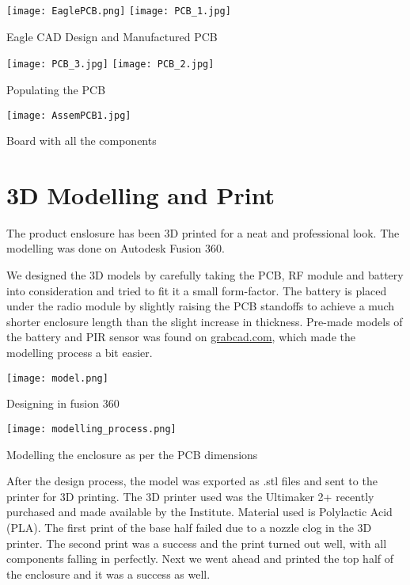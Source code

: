 \begin{center}
		\texttt{[image: EaglePCB.png]}		
		\hspace{10pt}
		\texttt{[image: PCB\_1.jpg]}
		
		Eagle CAD Design and Manufactured PCB
		
		\texttt{[image: PCB\_3.jpg]}		
		\texttt{[image: PCB\_2.jpg]}		
		
		Populating the PCB
		
		\vspace{20pt}
		\texttt{[image: AssemPCB1.jpg]}
		
		Board with all the components
		
		
\end{center}

\section{3D Modelling and Print}
The product enslosure has been 3D printed for a neat and professional look. The modelling was done on Autodesk Fusion 360.

We designed the 3D models by carefully taking the PCB, RF module and battery into consideration and tried to fit it a small form-factor. The battery is placed under the radio module by slightly raising the PCB standoffs to achieve a much shorter enclosure length than the slight increase in thickness. Pre-made models of the battery and PIR sensor was found on \url{grabcad.com}\cite{grabcad}, which made the modelling process a bit easier.

\begin{center}
	\texttt{[image: model.png]}
	
	Designing in fusion 360	
	\vspace{15pt}
	
	\texttt{[image: modelling\_process.png]}
	
	Modelling the enclosure as per the PCB dimensions
	\vspace{15pt}

\end{center}

After the design process, the model was exported as .stl files and sent to the printer for 3D printing. The 3D printer used was the Ultimaker 2+ recently purchased and made available by the Institute. Material used is Polylactic Acid (PLA). The first print of the base half failed due to a nozzle clog in the 3D printer. The second print was a success and the print turned out well, with all components falling in perfectly. Next we went ahead and printed the top half of the enclosure and it was a success as well.

